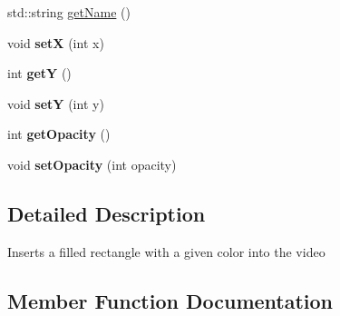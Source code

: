 \begin{DoxyCompactItemize}
\item 
std\+::string \hyperlink{classModel_1_1Filter_1_1RectangleFilter_ac0fc966d4386ddb71d99361e3fccb311}{get\+Name} ()
\item 
\hypertarget{classModel_1_1Filter_1_1RectangleFilter_add2578ea6b65ad27a905a6d2048748bb}{}void {\bfseries set\+X} (int x)\label{classModel_1_1Filter_1_1RectangleFilter_add2578ea6b65ad27a905a6d2048748bb}

\item 
\hypertarget{classModel_1_1Filter_1_1RectangleFilter_aab81944f0a14bba932c0931899951937}{}int {\bfseries get\+Y} ()\label{classModel_1_1Filter_1_1RectangleFilter_aab81944f0a14bba932c0931899951937}

\item 
\hypertarget{classModel_1_1Filter_1_1RectangleFilter_adea78a9ff1234e75627dda61d972213b}{}void {\bfseries set\+Y} (int y)\label{classModel_1_1Filter_1_1RectangleFilter_adea78a9ff1234e75627dda61d972213b}

\item 
\hypertarget{classModel_1_1Filter_1_1RectangleFilter_a0c8618c617e65d5ab8400704bbc09ed1}{}int {\bfseries get\+Opacity} ()\label{classModel_1_1Filter_1_1RectangleFilter_a0c8618c617e65d5ab8400704bbc09ed1}

\item 
\hypertarget{classModel_1_1Filter_1_1RectangleFilter_a22b140225648b55b27f2330938ae4006}{}void {\bfseries set\+Opacity} (int opacity)\label{classModel_1_1Filter_1_1RectangleFilter_a22b140225648b55b27f2330938ae4006}

\end{DoxyCompactItemize}


\subsection{Detailed Description}
Inserts a filled rectangle with a given color into the video 

\subsection{Member Function Documentation}
\hypertarget{classModel_1_1Filter_1_1RectangleFilter_a2b3f7d8fcd3d774b4a2fde5914a9729f}{}
